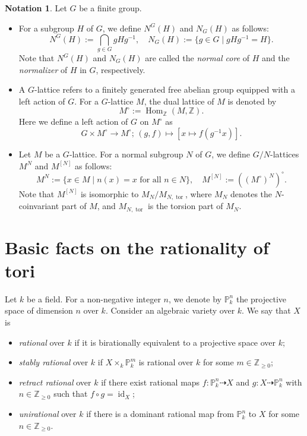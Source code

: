 \documentclass[12pt]{amsart}
\theoremstyle{plain}
\theoremstyle{definition}
\newtheorem*{nota}{Notation}
\numberwithin{thm}{section}
\numberwithin{equation}{section}
\newcommand{\Znn}{\mathbb{Z}_{\geq 0}}
\newcommand{\Z}{\mathbb{Z}}
\renewcommand{\P}{\mathbb{P}}
\DeclareMathOperator{\Hom}{Hom}
\DeclareMathOperator{\id}{id}
\DeclareMathOperator{\tor}{tor}
\begin{document}
\begin{nota}
Let $G$ be a finite group. 
\begin{itemize}
\item For a subgroup $H$ of $G$, we define $N^{G}(H)$ and $N_{G}(H)$ as follows: 
\begin{equation*}
N^{G}(H):=\bigcap_{g\in G}gHg^{-1},\quad
N_{G}(H):=\{g\in G\mid gHg^{-1}=H\}. 
\end{equation*}
Note that $N^{G}(H)$ and $N_{G}(H)$ are called the \emph{normal core} of $H$ and the \emph{normalizer} of $H$ in $G$, respectively. 
\item A $G$-lattice refers to a finitely generated free abelian group equipped with a left action of $G$. For a $G$-lattice $M$, the dual lattice of $M$ is denoted by
\begin{equation*}
    M^{\circ}:=\Hom_{\Z}(M,\Z). 
\end{equation*}
Here we define a left action of $G$ on $M^{\circ}$ as
\begin{equation*}
    G\times M^{\circ} \rightarrow M^{\circ};\,(g,f)\mapsto [x\mapsto f(g^{-1}x)]. 
\end{equation*}
\item Let $M$ be a $G$-lattice. For a normal subgroup $N$ of $G$, we define $G/N$-lattices $M^{N}$ and $M^{[N]}$ as follows: 
\begin{equation*}
M^{N}:=\{x\in M\mid n(x)=x\text{ for all }n\in N\},\quad 
M^{[N]}:=\left((M^{\circ})^{N}\right)^{\circ}. 
\end{equation*}
Note that $M^{[N]}$ is isomorphic to $M_{N}/M_{N,\tor}$, where $M_{N}$ denotes the $N$-coinvariant part of $M$, and $M_{N,\tor}$ is the torsion part of $M_{N}$. %
\end{itemize}
\end{nota}

\section{Basic facts on the rationality of tori}\label{sect:rvrt}

Let $k$ be a field. For a non-negative integer $n$, we denote by $\P_{k}^{n}$ the projective space of dimension $n$ over $k$. Consider an algebraic variety over $k$. We say that $X$ is
\begin{itemize}
    \item \emph{rational} over $k$ if it is birationally equivalent to a projective space over $k$; 
    \item \emph{stably rational} over $k$ if $X\times_{k}\P_{k}^{m}$ is rational over $k$ for some $m\in \Znn$; 
    \item \emph{retract rational} over $k$ if there exist rational maps $f\colon \P_{k}^{n}\dashrightarrow X$ and $g\colon X\dashrightarrow \P_{k}^{n}$ with $n\in \Znn$ such that $f\circ g=\id_{X}$; 
    \item \emph{unirational} over $k$ if there is a dominant rational map from $\P_{k}^{n}$ to $X$ for some $n\in \Znn$. 
\end{itemize}
\end{document}

